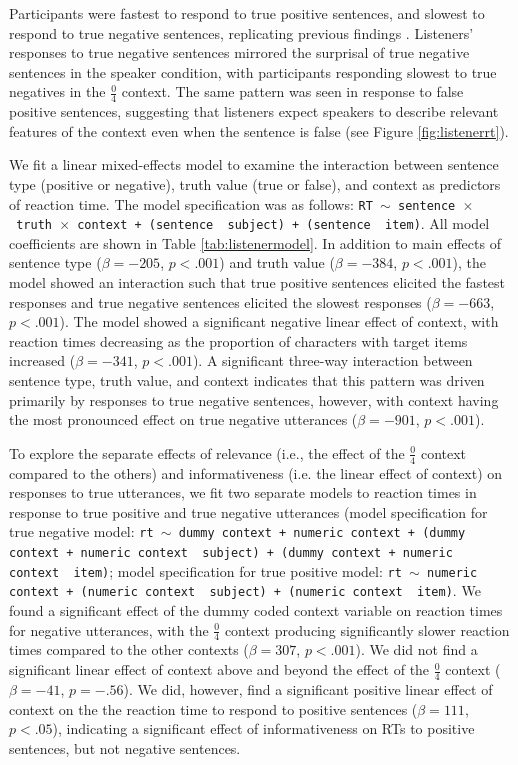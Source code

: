 \documentclass[man, noapacite]{apa2}
\begin{document}
Participants were fastest to respond to true positive sentences, and slowest to respond to true negative sentences, replicating previous findings \cite{hclark1972}.  Listeners' responses to true negative sentences mirrored the surprisal of true negative sentences in the speaker condition, with participants responding slowest to true negatives in the $\frac{0}{4}$ context.  The same pattern was seen in response to false positive sentences, suggesting that listeners expect speakers to describe relevant features of the context even when the sentence is false (see Figure \ref{fig:listenerrt}).  

We fit a linear mixed-effects model to examine the interaction between sentence type (positive or negative), truth value (true or false), and context as predictors of reaction time. The model specification was as follows: \texttt{RT $\sim$ sentence~$\times$~truth~$\times$~context + (sentence~\textbar~subject) +  (sentence~\textbar~item)}. All model coefficients are shown in Table \ref{tab:listenermodel}. In addition to main effects of sentence type ($\beta= -205$, $p< .001$) and truth value ($\beta= -384$, $p< .001$), the model showed an interaction such that true positive sentences elicited the fastest responses and true negative sentences elicited the slowest responses ($\beta= -663$, $p< .001$). The model showed a significant negative linear effect of context, with reaction times decreasing as the proportion of characters with target items increased ($\beta= -341$, $p< .001$). A significant three-way interaction between sentence type, truth value, and context indicates that this pattern was driven primarily by responses to true negative sentences, however, with context having the most pronounced effect on true negative utterances ($\beta= -901$, $p< .001$).  

To explore the separate effects of relevance (i.e., the effect of the $\frac{0}{4}$ context compared to the others) and informativeness (i.e. the linear effect of context) on responses to true utterances, we fit two separate models to reaction times in response to true positive and true negative utterances (model specification for true negative model: \texttt{rt $\sim$  dummy context + numeric context + (dummy context + numeric context~\textbar~subject) +  (dummy context + numeric context~\textbar~item)}; model specification for true positive model: \texttt{rt $\sim$  numeric context + (numeric context~\textbar~subject) +  (numeric context~\textbar~item)}. We found a significant effect of the dummy coded context variable on reaction times for negative utterances, with the $\frac{0}{4}$ context producing significantly slower reaction times compared to the other contexts ($\beta= 307$, $p< .001$). We did not find a significant linear effect of context above and beyond the effect of the  $\frac{0}{4}$ context ($\beta= -41$, $p = -.56$). We did, however, find a significant positive linear effect of context on the the reaction time to respond to positive sentences ($\beta= 111$, $p< .05$), indicating a significant effect of informativeness on RTs to positive sentences, but not negative sentences. 
\end{document}
